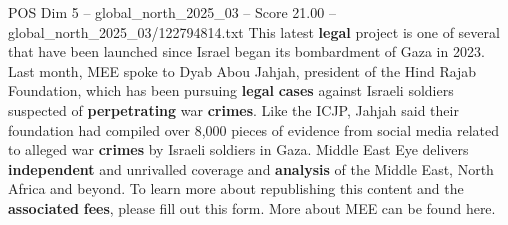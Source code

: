 \begin{textsample}{POS Dim 5 – global\_north\_2025\_03 – Score 21.00 – global\_north\_2025\_03/122794814.txt}
This latest \textbf{legal} project is one of several that have been launched since Israel began its bombardment of Gaza in 2023.
Last month, MEE spoke to Dyab Abou Jahjah, president of the Hind Rajab Foundation, which has been pursuing \textbf{legal} \textbf{cases} against Israeli soldiers suspected of \textbf{perpetrating} war \textbf{crimes}.
Like the ICJP, Jahjah said their foundation had compiled over 8,000 pieces of evidence from social media related to alleged war \textbf{crimes} by Israeli soldiers in Gaza.
Middle East Eye delivers \textbf{independent} and unrivalled coverage and \textbf{analysis} of the Middle East, North Africa and beyond.
To learn more about republishing this content and the \textbf{associated} \textbf{fees}, please fill out this form.
More about MEE can be found here.

\end{textsample}
